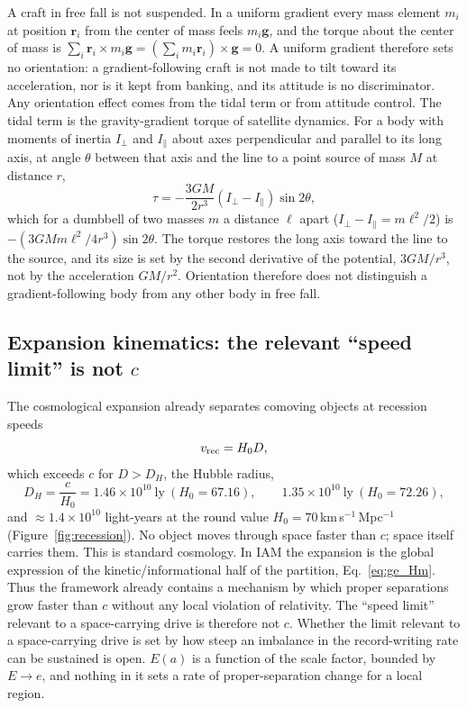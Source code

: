 A craft in free fall is not suspended. In a uniform gradient every mass element $m_i$ at position $\mathbf r_i$ from the center of mass feels
$m_i\mathbf g$, and the torque about the center of mass is $\sum_i\mathbf r_i\times m_i\mathbf g=(\sum_i m_i\mathbf r_i)\times\mathbf g=0$. A uniform
gradient therefore sets no orientation: a gradient-following craft is not made to tilt toward its acceleration, nor is it kept from banking, and its
attitude is no discriminator. \derived{} Any orientation effect comes from the tidal term or from attitude control. The tidal term is the
gravity-gradient torque of satellite dynamics. For a body with moments of inertia $I_\perp$ and $I_\parallel$ about axes perpendicular and parallel to
its long axis, at angle $\theta$ between that axis and the line to a point source of mass $M$ at distance $r$,
\begin{equation}
\tau=-\frac{3GM}{2r^3}\left(I_\perp-I_\parallel\right)\sin2\theta ,
\label{eq:ge_ggtorque}
\end{equation}
which for a dumbbell of two masses $m$ a distance $\ell$ apart ($I_\perp-I_\parallel=m\ell^2/2$) is $-(3GMm\ell^2/4r^3)\sin2\theta$. \derived{} The
torque restores the long axis toward the line to the source, and its size is set by the second derivative of the potential, $3GM/r^3$, not by the
acceleration $GM/r^2$. Orientation therefore does not distinguish a gradient-following body from any other body in free fall. \derived

\subsection{Expansion kinematics: the relevant ``speed limit'' is not \texorpdfstring{$c$}{c}}\label{sec:ge_expansion}
The cosmological expansion already separates comoving objects at recession speeds
\begin{equation}
v_{\rm rec}=H_0D ,
\label{eq:ge_vrec}
\end{equation}
which exceeds $c$ for $D>D_H$, the Hubble radius,
\begin{equation}
D_H=\frac{c}{H_0}=1.46\times10^{10}\ \text{ly}\ (H_0=67.16),\qquad 1.35\times10^{10}\ \text{ly}\ (H_0=72.26),
\label{eq:ge_DH}
\end{equation}
and $\approx1.4\times10^{10}$ light-years at the round value $H_0=70$\,km\,s$^{-1}$\,Mpc$^{-1}$ (Figure~\ref{fig:recession}). \calc{} No object moves
through space faster than $c$; space itself carries them. This is standard cosmology. In IAM the expansion is the global expression of the
kinetic/informational half of the partition, Eq.~\eqref{eq:ge_Hm}. \interp{} Thus the framework already contains a mechanism by which proper
separations grow faster than $c$ without any local violation of relativity. The ``speed limit'' relevant to a space-carrying drive is therefore not $c$. Whether the limit relevant to a space-carrying drive is set by how steep an
imbalance in the record-writing rate can be sustained is open. $E(a)$ is a function of the scale factor, bounded by $E\to e$, and nothing in it sets a
rate of proper-separation change for a local region. \openprob

